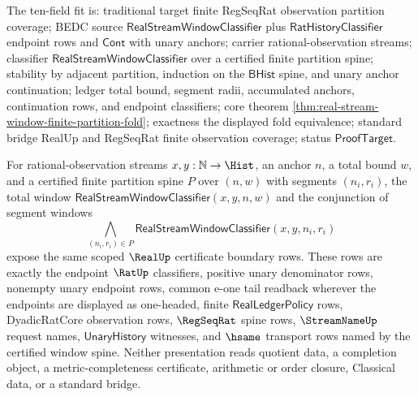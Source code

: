The ten-field fit is: traditional target finite RegSeqRat observation partition
coverage; BEDC source $\mathsf{RealStreamWindowClassifier}$ plus
$\mathsf{RatHistoryClassifier}$ endpoint rows and $\mathsf{Cont}$ with unary
anchors; carrier rational-observation streams; classifier
$\mathsf{RealStreamWindowClassifier}$ over a certified finite partition spine;
stability by adjacent partition, induction on the $\mathsf{BHist}$ spine, and
unary anchor continuation; ledger total bound, segment radii, accumulated
anchors, continuation rows, and endpoint classifiers; core theorem
\autoref{thm:real-stream-window-finite-partition-fold}; exactness the displayed
fold equivalence; standard bridge RealUp and RegSeqRat finite observation
coverage; status $\mathsf{ProofTarget}$.

\begin{theorem}
\label{thm:realup-window-partition-read-surface}
For rational-observation streams $x,y:\mathbb{N}\to\Hist$, an anchor $n$, a
total bound $w$, and a certified finite partition spine $P$ over $(n,w)$ with
segments $(n_i,r_i)$, the total window
$\mathsf{RealStreamWindowClassifier}(x,y,n,w)$ and the conjunction of segment
windows
$$
\bigwedge_{(n_i,r_i)\in P}
\mathsf{RealStreamWindowClassifier}(x,y,n_i,r_i)
$$
expose the same scoped $\RealUp$ certificate boundary rows. These rows are
exactly the endpoint $\RatUp$ classifiers, positive unary denominator rows,
nonempty unary endpoint rows, common e-one tail readback wherever the endpoints
are displayed as one-headed, finite $\mathsf{RealLedgerPolicy}$ rows,
DyadicRatCore observation rows, $\RegSeqRat$ spine rows, $\StreamNameUp$ request
names, $\mathsf{UnaryHistory}$ witnesses, and $\hsame$ transport rows named by
the certified window spine. Neither presentation reads quotient data, a
completion object, a metric-completeness certificate, arithmetic or order
closure, Classical data, or a standard bridge.
\end{theorem}
